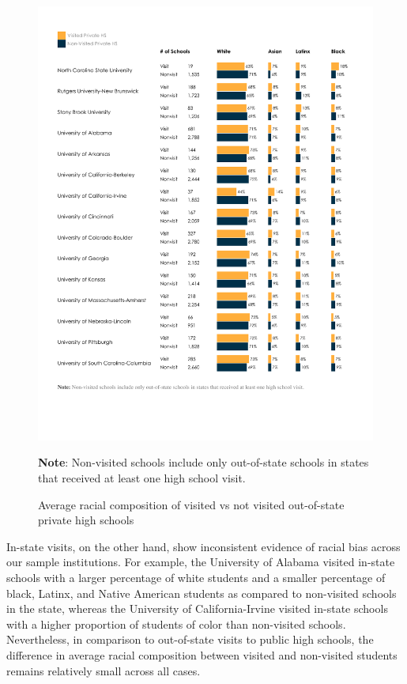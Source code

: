 \documentclass{article}
\begin{document}
\begin{figure}[!ht]
    \centering
    \includegraphics[width=\textwidth, trim={1.25cm, 4cm, 1cm, 1.5cm}, clip]{assets/graphs/race_graph_priv_out.pdf}
    \begin{flushleft}\textbf{Note}: Non-visited schools include only out-of-state schools in states that received at least one high school visit.\end{flushleft}
    \caption{Average racial composition of visited vs not visited out-of-state private high schools}
    \label{fig:race_graph_priv_out}
\end{figure}

In-state visits, on the other hand, show inconsistent evidence of racial bias across our sample institutions. For example, the University of Alabama visited in-state schools with a larger percentage of white students and a smaller percentage of black, Latinx, and Native American students as compared to non-visited schools in the state, whereas the University of California-Irvine visited in-state schools with a higher proportion of students of color than non-visited schools. Nevertheless, in comparison to out-of-state visits to public high schools, the difference in average racial composition between visited and non-visited students remains relatively small across all cases.
\end{document}
